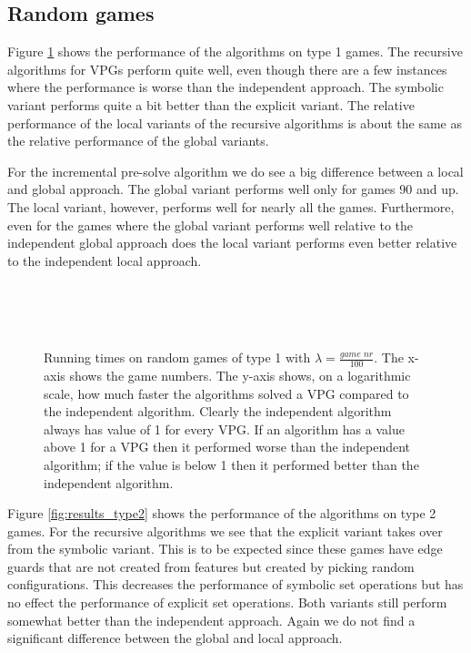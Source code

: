 \subsection{Random games}
Figure \ref{fig:results_type1} shows the performance of the algorithms on type 1 games. The recursive algorithms for VPGs perform quite well, even though there are a few instances where the performance is worse than the independent approach. The symbolic variant performs quite a bit better than the explicit variant. The relative performance of the local variants of the recursive algorithms is about the same as the relative performance of the global variants. 

For the incremental pre-solve algorithm we do see a big difference between a local and global approach. The global variant performs well only for games 90 and up. The local variant, however, performs well for nearly all the games. Furthermore, even for the games where the global variant performs well relative to the independent global approach does the local variant performs even better relative to the independent local approach.
\begin{figure}[H]
	\centering
	\begin{multicols}{2}
		\\
		\\
		\\
		
	\end{multicols}
	\caption{Running times on random games of type 1 with $\lambda = \frac{\textit{game nr}}{100}$. The x-axis shows the game numbers. The y-axis shows, on a logarithmic scale, how much faster the algorithms solved a VPG compared to the independent algorithm. Clearly the independent algorithm always has value of 1 for every VPG. If an algorithm has a value above 1 for a VPG then it performed worse than the independent algorithm; if the value is below 1 then it performed better than the independent algorithm.}
	\label{fig:results_type1}
\end{figure}%


Figure \ref{fig:results_type2} shows the performance of the algorithms on type 2 games. For the recursive algorithms we see that the explicit variant takes over from the symbolic variant. This is to be expected since these games have edge guards that are not created from features but created by picking random configurations. This decreases the performance of symbolic set operations but has no effect the performance of explicit set operations. Both variants still perform somewhat better than the independent approach. Again we do not find a significant difference between the global and local approach.


